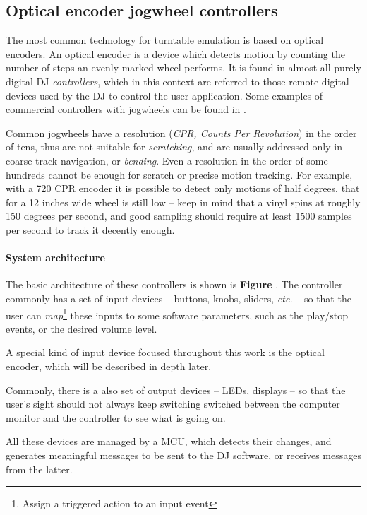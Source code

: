 \documentclass[a4paper,10pt]{article}
\begin{document}
\begin{multicols}{2}
\subsection{Optical encoder jogwheel controllers}

The most common technology for turntable emulation is based on optical encoders.
An optical encoder is a device which detects motion by counting the number of steps
an evenly-marked wheel performs. It is found in almost all purely digital DJ
\emph{controllers}, which in this context are referred to those remote digital
devices used by the DJ to control the user application. Some examples of commercial
controllers with jogwheels can be found in \CITEME.

Common jogwheels have a resolution (\emph{CPR, Counts Per Revolution}) in the order of
tens, thus are not suitable for \emph{scratching}\CITEME, and are usually addressed
only in coarse track navigation, or \emph{bending}\CITEME.
Even a resolution in the order of some hundreds cannot be enough for scratch or precise
motion tracking. For example, with a 720 CPR encoder it is possible to detect only
motions of half degrees, that for a 12 inches wide wheel is still low -- keep in mind
that a vinyl spins at roughly 150 degrees per second, and good sampling should require
at least 1500 samples per second to track it decently enough.


\paragraph{System architecture}
The basic architecture of these controllers is shown is \textbf{Figure \CITEME}.
The controller commonly has a set of input devices -- buttons, knobs,
sliders, \textit{etc.} -- so that the user can \emph{map}\footnote{
	Assign a triggered action to an input event
} these inputs to some software parameters, such as the play/stop events, or the desired
volume level.

A special kind of input device focused throughout this work is the optical encoder,
\TODO which will be described in depth later.

Commonly, there is a also set of output devices -- LEDs, displays -- so that the
user's sight should not always keep switching switched between the computer monitor
and the controller to see what is going on.

All these devices are managed by a MCU, which detects their changes, and generates
meaningful messages to be sent to the DJ software, or receives messages from the latter.


\end{multicols}
\end{document}
